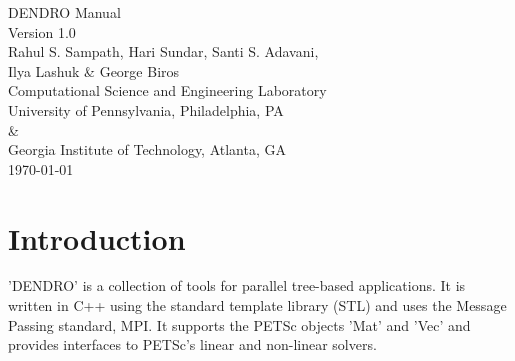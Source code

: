 \documentclass[12pt,reqno,a4paper]{report}
\numberwithin{equation}{section}
\begin{document}
\begin{titlepage}

\begin{center}

{\large DENDRO Manual }\\[1cm]

{\large Version 1.0 }\\[2cm]

{\large Rahul S. Sampath, Hari Sundar, Santi S. Adavani,}\\
{\large Ilya Lashuk \& George Biros}\\[2cm]

{\large Computational Science and Engineering Laboratory}\\[2cm]

{\large University of Pennsylvania, Philadelphia, PA}\\[1cm]
{\&}\\[1cm]
{\large Georgia Institute of Technology, Atlanta, GA}\\[2cm]

{\large \today}

\end{center}

\end{titlepage}

\newpage

\tableofcontents

\newpage

\lstset{language=c++}
\lstset{commentstyle=\textit\scriptsize}
\lstset{numbers=none}
\lstset{basicstyle=\scriptsize}

\chapter{Introduction}
\label{sec:introduction}
'DENDRO' is a collection of tools for parallel tree-based applications. It is written in C++ using the standard template library (STL) and uses the Message Passing standard, MPI. It supports the PETSc objects 'Mat' and 'Vec' and provides interfaces to PETSc's linear and non-linear solvers.
\end{document}

